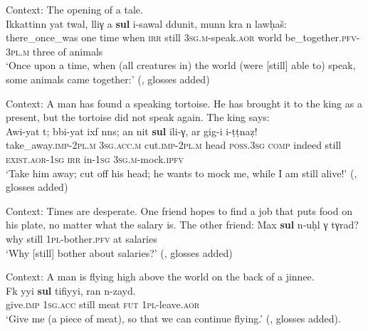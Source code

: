 \begin{exe}
	\ex Context: The opening of a tale.\\
	\gll Ikkattinn yat twal, lliγ a \textbf{sul} i-sawal ddunit, munn kra n lawḥaš:\\
	there\_once\_was one time when \textsc{irr} still 3\textsc{sg}.\textsc{m}-speak.\textsc{aor} world be\_together.\textsc{pfv}-3\textsc{pl}.\textsc{m} three of animals\\
	\glt \lq Once upon a time, when (all creatures in) the world (were [still] able to) speak, some animals came together:' (\cite[244–245]{Stroomer2002}, glosses added)
	
	\ex Context: A man has found a speaking tortoise. He has brought it to the king as a present, but the tortoise did not speak again. The king says: \label{exAppendixTashelhyit2}\\
	\gll Awi-yat t; bbi-yat ixf nns; an nit \textbf{sul} ili-γ, ar gig-i i-ṭṭnaẓ!\\
	take\_away.\textsc{imp}-2\textsc{pl}.\textsc{m} 3\textsc{sg}.\textsc{acc}.\textsc{m} cut.\textsc{imp}-2\textsc{pl}.\textsc{m} head \textsc{poss}.3\textsc{sg} \textsc{comp} indeed still \textsc{exist}.\textsc{aor}-1\textsc{sg} \textsc{irr} in-1\textsc{sg} 3\textsc{sg}.\textsc{m}-mock.\textsc{ipfv}\\
	\glt \lq Take him away; cut off his head; he wants to mock me, while I am still alive!' (\cite[226–227]{Stroomer2002}, glosses added)

	\ex	Context: Times are desperate. One friend hopes to find a job that puts food on his plate, no matter what the salary is. The other friend: \label{exAppendixTashelhyit3}
	\gll Max \textbf{sul} n-uḥl γ tγrad?\\
	why still 1\textsc{pl}-bother.\textsc{pfv} at salaries\\
	\glt \lq Why [still] bother about salaries?\rq{ }(\cite[164–165]{Stroomer2001}, glosses added)
	
	\ex Context: A man is flying high above the world on the back of a jinnee.\\
	\gll Fk	 yyi 				\textbf{sul}		tifiyyi,		ran	n-zayd.\\
	give.\textsc{imp} 1\textsc{sg}.\textsc{acc} still meat \textsc{fut} 1\textsc{pl}-leave.\textsc{aor}\\
	\glt \lq Give me (a piece of meat), so that we can continue flying.\rq{ }(\cite[116]{Stroomer2002}, glosses added).	
\end{exe}\largerpage[2]

